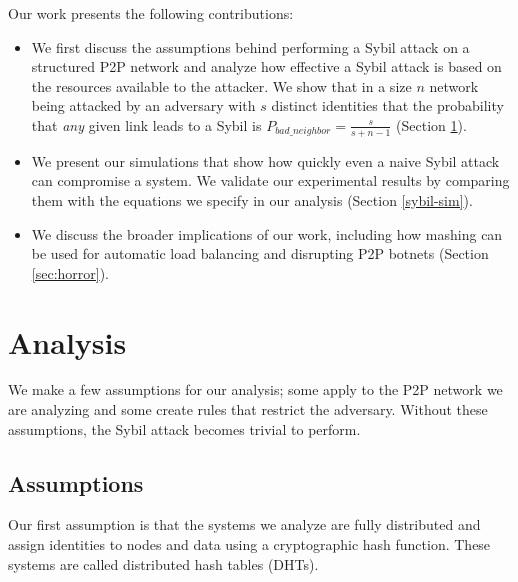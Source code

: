 
Our work presents the following contributions:
\begin{itemize}
	\item We first discuss the assumptions behind performing a Sybil attack on a structured P2P network and analyze how effective a Sybil attack is based on the resources available to the attacker.
	We show that in a size $n$ network being attacked by an adversary with $s$ distinct identities that the probability that \textit{any} given link leads to a Sybil is $P_{bad\_neighbor} =  \frac{s}{s+ n - 1}$ (Section \ref{sec:analysis}). 
	\item We present our simulations that show how quickly even a naive Sybil attack can compromise a system. 
	We validate our experimental results by comparing them with the equations we specify in our analysis (Section \ref{sybil-sim}).
	\item We discuss the broader implications of our work, including how mashing can be used for automatic load balancing and disrupting P2P botnets (Section \ref{sec:horror}).
\end{itemize}

\section{Analysis}
\label{sec:analysis}

We make a few assumptions for our analysis; some apply to the P2P network we are analyzing and some create rules that restrict the adversary.
Without these assumptions, the Sybil attack becomes trivial to perform.



\subsection{Assumptions}
\label{sec:assume}

Our first assumption is that the systems we analyze are fully distributed and assign identities to nodes and data using a cryptographic hash function.
These systems are called distributed hash tables (DHTs).


